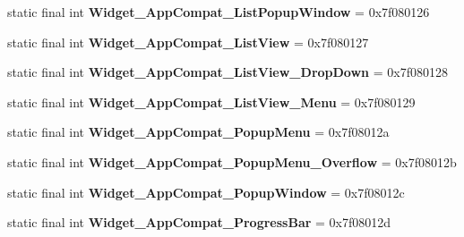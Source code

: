 \begin{DoxyCompactItemize}
\item 
\hypertarget{classandroid_1_1support_1_1design_1_1_r_1_1style_ad8f90fca8c6fe4f82764d8c71e26cc9e}{}static final int {\bfseries Widget\+\_\+\+App\+Compat\+\_\+\+List\+Popup\+Window} = 0x7f080126\label{classandroid_1_1support_1_1design_1_1_r_1_1style_ad8f90fca8c6fe4f82764d8c71e26cc9e}

\item 
\hypertarget{classandroid_1_1support_1_1design_1_1_r_1_1style_a9ccf0592624b31bfc316c13457666037}{}static final int {\bfseries Widget\+\_\+\+App\+Compat\+\_\+\+List\+View} = 0x7f080127\label{classandroid_1_1support_1_1design_1_1_r_1_1style_a9ccf0592624b31bfc316c13457666037}

\item 
\hypertarget{classandroid_1_1support_1_1design_1_1_r_1_1style_ab67dfc2e7a77263ca823b0590eda7828}{}static final int {\bfseries Widget\+\_\+\+App\+Compat\+\_\+\+List\+View\+\_\+\+Drop\+Down} = 0x7f080128\label{classandroid_1_1support_1_1design_1_1_r_1_1style_ab67dfc2e7a77263ca823b0590eda7828}

\item 
\hypertarget{classandroid_1_1support_1_1design_1_1_r_1_1style_aa09a8e109ec40dc7c46cc3840732d1f8}{}static final int {\bfseries Widget\+\_\+\+App\+Compat\+\_\+\+List\+View\+\_\+\+Menu} = 0x7f080129\label{classandroid_1_1support_1_1design_1_1_r_1_1style_aa09a8e109ec40dc7c46cc3840732d1f8}

\item 
\hypertarget{classandroid_1_1support_1_1design_1_1_r_1_1style_a5be61913be313ee9343c327d6a484a45}{}static final int {\bfseries Widget\+\_\+\+App\+Compat\+\_\+\+Popup\+Menu} = 0x7f08012a\label{classandroid_1_1support_1_1design_1_1_r_1_1style_a5be61913be313ee9343c327d6a484a45}

\item 
\hypertarget{classandroid_1_1support_1_1design_1_1_r_1_1style_a575cc5a614049c69898d8e1cdc96eed5}{}static final int {\bfseries Widget\+\_\+\+App\+Compat\+\_\+\+Popup\+Menu\+\_\+\+Overflow} = 0x7f08012b\label{classandroid_1_1support_1_1design_1_1_r_1_1style_a575cc5a614049c69898d8e1cdc96eed5}

\item 
\hypertarget{classandroid_1_1support_1_1design_1_1_r_1_1style_ad01cd09f11b7b01c4e2e498efaf849f4}{}static final int {\bfseries Widget\+\_\+\+App\+Compat\+\_\+\+Popup\+Window} = 0x7f08012c\label{classandroid_1_1support_1_1design_1_1_r_1_1style_ad01cd09f11b7b01c4e2e498efaf849f4}

\item 
\hypertarget{classandroid_1_1support_1_1design_1_1_r_1_1style_a5ec9d21fb8b380e4d5dd750b5c18154a}{}static final int {\bfseries Widget\+\_\+\+App\+Compat\+\_\+\+Progress\+Bar} = 0x7f08012d\label{classandroid_1_1support_1_1design_1_1_r_1_1style_a5ec9d21fb8b380e4d5dd750b5c18154a}


\end{DoxyCompactItemize}
